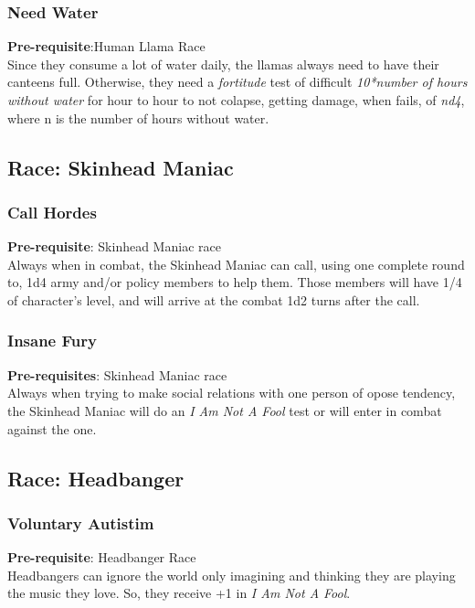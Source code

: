 \documentclass[ letterpaper,12pt]{article}
\begin{document}
\subsubsection{Need Water}
{\bf Pre-requisite}:Human Llama Race\\
Since they consume a lot of water daily, the llamas always need to have their canteens full. Otherwise, they need a {\it fortitude} test of difficult {\it 10*number of hours without water} for hour to hour to not colapse, getting damage, when fails, of {\it nd4}, where n is the number of hours without water.

\subsection{Race: Skinhead Maniac}

\subsubsection{Call Hordes}
 {\bf Pre-requisite}: Skinhead Maniac race\\
 Always when in combat, the Skinhead Maniac can call, using one complete round to, 1d4 army and/or policy members to help them. Those members will have 1/4 of character's level, and will arrive at the combat 1d2 turns after the call.

\subsubsection{Insane Fury}
 {\bf Pre-requisites}: Skinhead Maniac race\\
 Always when trying to make social relations with one person of opose tendency, the Skinhead Maniac will do an {\it I Am Not A Fool} test or will enter in combat against the one.

\subsection{Race: Headbanger}

\subsubsection{Voluntary Autistim}
{\bf Pre-requisite}: Headbanger Race\\
Headbangers can ignore the world only imagining and thinking they are playing the music they love. So, they receive +1 in {\it I Am Not A Fool}.\\
\end{document}
